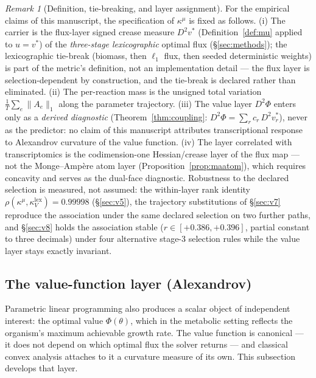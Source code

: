\documentclass[11pt,a4paper]{article}
\theoremstyle{plain}
\theoremstyle{definition}
\theoremstyle{remark}
\newtheorem{remark}[theorem]{Remark}
\newcommand{\kk}{\kappa_{\!V}}
\newcommand{\kmu}{\kappa^{\mu}}
\begin{document}
\begin{remark}[Definition, tie-breaking, and layer assignment]
\label{rem:lock}
For the empirical claims of this manuscript, the specification of
$\kmu$ is fixed as follows. (i) The carrier is the flux-layer signed crease measure
$D^2 v^*$ (Definition~\ref{def:mu} applied to $u = v^*$) of the
\emph{three-stage lexicographic} optimal flux (\S\ref{sec:methods});
the lexicographic tie-break (biomass, then $\ell_1$ flux, then seeded
deterministic weights) is part of the metric's definition, not an
implementation detail --- the flux layer is selection-dependent by
construction, and the tie-break is declared rather than eliminated.
(ii) The per-reaction mass is the unsigned total variation
$\frac{1}{T}\sum_e \|A_e\|_1$ along the parameter trajectory.
(iii) The value layer $D^2\Phi$ enters only as a \emph{derived
diagnostic} (Theorem~\ref{thm:coupling}:
$D^2\Phi = \sum_r c_r\, D^2 v^*_r$), never as the predictor: no claim
of this manuscript attributes transcriptional response to Alexandrov
curvature of the value function. (iv) The layer correlated with
transcriptomics is the codimension-one Hessian/crease layer of the
flux map --- not the Monge--Amp\`ere atom layer
(Proposition~\ref{prop:maatom}), which requires concavity and serves
as the dual-face diagnostic. Robustness to the declared selection is
measured, not assumed: the within-layer rank identity
$\rho(\kmu, \kk^{\mathrm{lex}}) = 0.99998$ (\S\ref{sec:v5}), the trajectory substitutions of \S\ref{sec:v7} reproduce the association under the same declared selection on two further paths, and \S\ref{sec:v8} holds the
association stable ($r \in [+0.386, +0.396]$, partial constant to
three decimals) under four alternative stage-3 selection rules while
the value layer stays exactly invariant.
\end{remark}

\subsection{The value-function layer (Alexandrov)}

Parametric linear programming also produces a scalar object of
independent interest: the optimal value $\Phi(\theta)$, which in the
metabolic setting reflects the organism's maximum achievable growth
rate. The value function is canonical --- it does not depend on which
optimal flux the solver returns --- and classical convex analysis
attaches to it a curvature measure of its own. This subsection develops
that layer.
\end{document}
